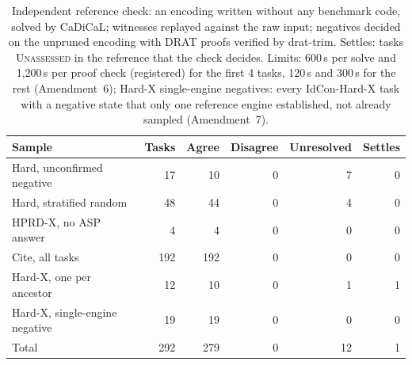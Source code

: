 \begin{table}[t]
\caption{Independent reference check: an encoding written without any benchmark code, solved by CaDiCaL; witnesses replayed against the raw input; negatives decided on the unpruned encoding with DRAT proofs verified by drat-trim. Settles: tasks \textsc{Unassessed} in the reference that the check decides. Limits: 600\,s per solve and 1,200\,s per proof check (registered) for the first 4 tasks, 120\,s and 300\,s for the rest (Amendment~6); Hard-X single-engine negatives: every IdCon-Hard-X task with a negative state that only one reference engine established, not already sampled (Amendment~7).}
\label{tab:idcheck}
\centering\footnotesize
\setlength{\tabcolsep}{3pt}
\begin{tabular}{lrrrrr}
\toprule
Sample & Tasks & Agree & Disagree & Unresolved & Settles\\
\midrule
Hard, unconfirmed negative & 17 & 10 & 0 & 7 & 0\\
Hard, stratified random & 48 & 44 & 0 & 4 & 0\\
HPRD-X, no ASP answer & 4 & 4 & 0 & 0 & 0\\
Cite, all tasks & 192 & 192 & 0 & 0 & 0\\
Hard-X, one per ancestor & 12 & 10 & 0 & 1 & 1\\
Hard-X, single-engine negative & 19 & 19 & 0 & 0 & 0\\
\midrule
Total & 292 & 279 & 0 & 12 & 1\\
\bottomrule
\end{tabular}
\end{table}

